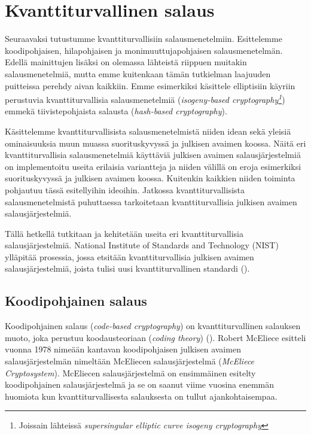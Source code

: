 \chapter{Kvanttiturvallinen salaus\label{results}}
Seuraavaksi tutustumme kvanttiturvallisiin salausmenetelmiin. Esittelemme koodipohjaisen, hilapohjaisen ja monimuuttujapohjaisen salausmenetelmän. Edellä mainittujen lisäksi on olemassa lähteistä riippuen muitakin salausmenetelmiä, mutta emme kuitenkaan tämän tutkielman laajuuden puitteissa perehdy aivan kaikkiin. Emme esimerkiksi käsittele elliptisiin käyriin perustuvia kvanttiturvallisia salausmenetelmiä (\emph{isogeny-based cryptography\footnote{Joissain lähteissä \emph{supersingular elliptic curve isogeny cryptography}}}) emmekä tiivistepohjaista salausta (\emph{hash-based cryptography}).

Käsittelemme kvanttiturvallisista salausmenetelmistä niiden idean sekä yleisiä ominaisuuksia muun muassa suorituskyvyssä ja julkisen avaimen koossa. Näitä eri kvanttiturvallisia salausmenetelmiä käyttäviä julkisen avaimen salausjärjestelmiä on implementoitu useita erilaisia variantteja ja niiden välillä on eroja esimerkiksi suorituskyvyssä ja julkisen avaimen koossa. Kuitenkin kaikkien niiden toiminta pohjautuu tässä esitellyihin ideoihin. Jatkossa kvanttiturvallisista salausmenetelmistä puhuttaessa tarkoitetaan kvanttiturvallisia julkisen avaimen salausjärjestelmiä.

Tällä hetkellä tutkitaan ja kehitetään useita eri kvanttiturvallisia salausjärjestelmiä. National Institute of Standards and Technology (NIST) ylläpitää prosessia, jossa etsitään kvanttiturvallisia julkisen avaimen salausjärjestelmiä, joista tulisi uusi kvanttiturvallinen standardi (\cite{alagic2020status}).

\section{Koodipohjainen salaus}
Koodipohjainen salaus (\emph{code-based cryptography}) on kvanttiturvallinen salauksen muoto, joka perustuu koodausteoriaan (\emph{coding theory}) (\cite{repka2014overview}). Robert McEliece esitteli vuonna 1978 nimeään kantavan koodipohjaisen julkisen avaimen salausjärjestelmän nimeltään McEliecen salausjärjestelmä (\emph{McEliece Cryptosystem}). McEliecen salausjärjestelmä on ensimmäinen esitelty koodipohjainen salausjärjestelmä ja se on saanut viime vuosina enemmän huomiota kun kvanttiturvallisesta salauksesta on tullut ajankohtaisempaa.


